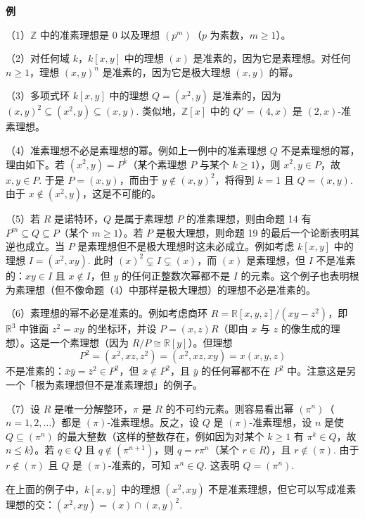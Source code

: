 \noindent\textbf{例}

（1）\(\mathbb{Z}\) 中的准素理想是 \(0\) 以及理想 \((p^m)\)（\(p\) 为素数，\(m \geq 1\)）。

（2）对任何域 \(k\)，\(k[x,y]\) 中的理想 \((x)\) 是准素的，因为它是素理想。对任何 \(n \geq 1\)，理想 \((x,y)^n\) 是准素的，因为它是极大理想 \((x,y)\) 的幂。

（3）多项式环 \(k[x,y]\) 中的理想 \(Q = (x^2,y)\) 是准素的，因为 \((x,y)^2 \subseteq (x^2,y) \subseteq (x,y)\). 类似地，\(\mathbb{Z}[x]\) 中的 \(Q' = (4,x)\) 是 \((2,x)\)-准素理想。

（4）准素理想不必是素理想的幂。例如上一例中的准素理想 \(Q\) 不是素理想的幂，理由如下。若 \((x^2,y) = P^k\)（某个素理想 \(P\) 与某个 \(k \geq 1\)），则 \(x^2, y \in P\)，故 \(x, y \in P\). 于是 \(P = (x,y)\)，而由于 \(y \notin (x,y)^2\)，将得到 \(k = 1\) 且 \(Q = (x,y)\). 由于 \(x \notin (x^2,y)\)，这是不可能的。

（5）若 \(R\) 是诺特环，\(Q\) 是属于素理想 \(P\) 的准素理想，则由命题 14 有 \(P^m \subseteq Q \subseteq P\)（某个 \(m \geq 1\)）。若 \(P\) 是极大理想，则命题 19 的最后一个论断表明其逆也成立。当 \(P\) 是素理想但不是极大理想时这未必成立。例如考虑 \(k[x,y]\) 中的理想 \(I = (x^2,xy)\). 此时 \((x)^2 \subsetneq I \subsetneq (x)\)，而 \((x)\) 是素理想，但 \(I\) 不是准素的：\(xy \in I\) 且 \(x \notin I\)，但 \(y\) 的任何正整数次幂都不是 \(I\) 的元素。这个例子也表明根为素理想（但不像命题（4）中那样是极大理想）的理想不必是准素的。

（6）素理想的幂不必是准素的。例如考虑商环 \(R = \mathbb{R}[x,y,z]/(xy-z^2)\)，即 \(\mathbb{R}^3\) 中锥面 \(z^2 = xy\) 的坐标环，并设 \(P = (x,z)R\)（即由 \(x\) 与 \(z\) 的像生成的理想）。这是一个素理想（因为 \(R/P \cong \mathbb{R}[y]\)）。但理想
\[
P^2 = (x^2, xz, z^2) = (x^2, xz, xy) = x(x,y,z)
\]
不是准素的：\(\bar x\bar y = \bar z^2 \in P^2\)，但 \(\bar x \notin P^2\)，且 \(\bar y\) 的任何幂都不在 \(P^2\) 中。注意这是另一个「根为素理想但不是准素理想」的例子。

（7）设 \(R\) 是唯一分解整环，\(\pi\) 是 \(R\) 的不可约元素。则容易看出幂 \((\pi^n)\)（\(n = 1, 2, \ldots\)）都是 \((\pi)\)-准素理想。反之，设 \(Q\) 是 \((\pi)\)-准素理想，设 \(n\) 是使 \(Q \subseteq (\pi^n)\) 的最大整数（这样的整数存在，例如因为对某个 \(k \geq 1\) 有 \(\pi^k \in Q\)，故 \(n \leq k\)）。若 \(q \in Q\) 且 \(q \notin (\pi^{n+1})\)，则 \(q = r\pi^n\)（某个 \(r \in R\)），且 \(r \notin (\pi)\). 由于 \(r \notin (\pi)\) 且 \(Q\) 是 \((\pi)\)-准素的，可知 \(\pi^n \in Q\). 这表明 \(Q = (\pi^n)\).

在上面的例子中，\(k[x,y]\) 中的理想 \((x^2,xy)\) 不是准素理想，但它可以写成准素理想的交：\((x^2,xy) = (x) \cap (x,y)^2\).

